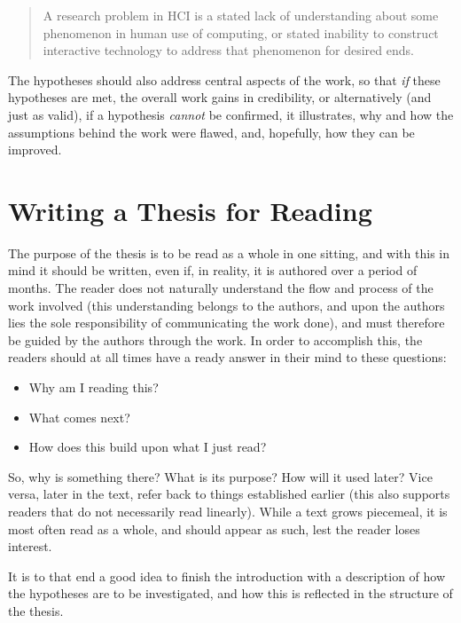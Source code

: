 \begin{quote}
  A research problem in HCI is a stated lack of understanding about some
  phenomenon in human use of computing, or stated inability to construct
  interactive technology to address that phenomenon for desired
  ends.~\cite[Def.\ 1]{Oulasvirta2016:POT2CCOHFICS2016}
\end{quote}


The hypotheses should also address central aspects of the work, so that
\emph{if} these hypotheses are met, the overall work gains in credibility,
or alternatively (and just as valid), if a hypothesis \emph{cannot} be
confirmed, it illustrates, why and how the assumptions behind the work were
flawed, and, hopefully, how they can be improved.

\section{Writing a Thesis for Reading}
\label{sec:writ-thes-read}

The purpose of the thesis is to be read as a whole in one sitting, and with
this in mind it should be written, even if, in reality, it is authored over
a period of months.  The reader does not naturally understand the flow and
process of the work involved (this understanding belongs to the authors, and
upon the authors lies the sole responsibility of communicating the work
done), and must therefore be guided by the authors through the work.  In
order to accomplish this, the readers should at all times have a ready
answer in their mind to these questions:

\begin{itemize}
\item Why am I reading this?
\item What comes next?
\item How does this build upon what I just read?
\end{itemize}

So, why is something there? What is its purpose? How will it used later?
Vice versa, later in the text, refer back to things established earlier
(this also supports readers that do not necessarily read linearly). While a
text grows piecemeal, it is most often read as a whole, and should appear as
such, lest the reader loses interest.

It is to that end a good idea to finish the introduction with a description
of how the hypotheses are to be investigated, and how this is reflected in
the structure of the thesis.


